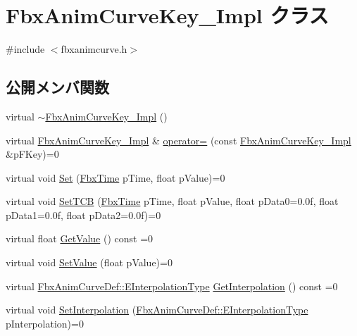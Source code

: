 \hypertarget{class_fbx_anim_curve_key___impl}{}\section{Fbx\+Anim\+Curve\+Key\+\_\+\+Impl クラス}
\label{class_fbx_anim_curve_key___impl}


{\ttfamily \#include $<$fbxanimcurve.\+h$>$}

\subsection*{公開メンバ関数}
\begin{DoxyCompactItemize}
\item 
virtual \hyperlink{class_fbx_anim_curve_key___impl_a52adc8a5f5eb8cef39338e8b06a941a5}{$\sim$\+Fbx\+Anim\+Curve\+Key\+\_\+\+Impl} ()
\item 
virtual \hyperlink{class_fbx_anim_curve_key___impl}{Fbx\+Anim\+Curve\+Key\+\_\+\+Impl} \& \hyperlink{class_fbx_anim_curve_key___impl_a6d307ce9add998d6e24108c12557403f}{operator=} (const \hyperlink{class_fbx_anim_curve_key___impl}{Fbx\+Anim\+Curve\+Key\+\_\+\+Impl} \&p\+F\+Key)=0
\item 
virtual void \hyperlink{class_fbx_anim_curve_key___impl_a07c1455e7457020e5452670ecedc6388}{Set} (\hyperlink{class_fbx_time}{Fbx\+Time} p\+Time, float p\+Value)=0
\item 
virtual void \hyperlink{class_fbx_anim_curve_key___impl_a7aa6e95254beb6c1bc43495629e766e1}{Set\+T\+CB} (\hyperlink{class_fbx_time}{Fbx\+Time} p\+Time, float p\+Value, float p\+Data0=0.\+0f, float p\+Data1=0.\+0f, float p\+Data2=0.\+0f)=0
\item 
virtual float \hyperlink{class_fbx_anim_curve_key___impl_acf6a01e7679d11a13f6c919899c6d25d}{Get\+Value} () const =0
\item 
virtual void \hyperlink{class_fbx_anim_curve_key___impl_a78916ed4b835348762ff1793b34089b9}{Set\+Value} (float p\+Value)=0
\item 
virtual \hyperlink{class_fbx_anim_curve_def_add2ab7d10d856ab0868cc9b143d59ea5}{Fbx\+Anim\+Curve\+Def\+::\+E\+Interpolation\+Type} \hyperlink{class_fbx_anim_curve_key___impl_a1179a0392a3cdfeed9219b86539c0beb}{Get\+Interpolation} () const =0
\item 
virtual void \hyperlink{class_fbx_anim_curve_key___impl_af7693712573d103db3de8984f2993f99}{Set\+Interpolation} (\hyperlink{class_fbx_anim_curve_def_add2ab7d10d856ab0868cc9b143d59ea5}{Fbx\+Anim\+Curve\+Def\+::\+E\+Interpolation\+Type} p\+Interpolation)=0

\end{DoxyCompactItemize}
